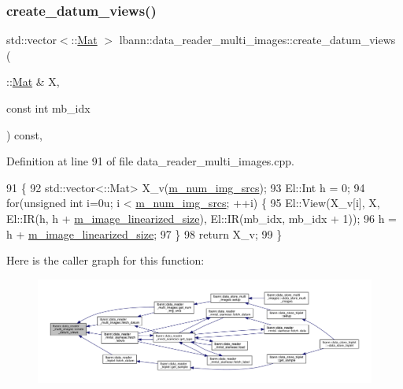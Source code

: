 \subsubsection{\texorpdfstring{create\+\_\+datum\+\_\+views()}{create\_datum\_views()}}
{\footnotesize\ttfamily std\+::vector$<$\+::\hyperlink{base_8hpp_a68f11fdc31b62516cb310831bbe54d73}{Mat} $>$ lbann\+::data\+\_\+reader\+\_\+multi\+\_\+images\+::create\+\_\+datum\+\_\+views (\begin{DoxyParamCaption}\item[{\+::\hyperlink{base_8hpp_a68f11fdc31b62516cb310831bbe54d73}{Mat} \&}]{X,  }\item[{const int}]{mb\+\_\+idx }\end{DoxyParamCaption}) const\hspace{0.3cm}{\ttfamily [protected]}, {\ttfamily [virtual]}}



Definition at line 91 of file data\+\_\+reader\+\_\+multi\+\_\+images.\+cpp.


\begin{DoxyCode}
91                                                                                           \{
92   std::vector<::Mat> X\_v(\hyperlink{classlbann_1_1data__reader__multi__images_a70752a5442e99333fec52def9eadc58f}{m\_num\_img\_srcs});
93   El::Int h = 0;
94   \textcolor{keywordflow}{for}(\textcolor{keywordtype}{unsigned} \textcolor{keywordtype}{int} i=0u; i < \hyperlink{classlbann_1_1data__reader__multi__images_a70752a5442e99333fec52def9eadc58f}{m\_num\_img\_srcs}; ++i) \{
95     El::View(X\_v[i], X, El::IR(h, h + \hyperlink{classlbann_1_1image__data__reader_af512f1f866c0f654309b7f28886dca9a}{m\_image\_linearized\_size}), El::IR(mb\_idx, 
      mb\_idx + 1));
96     h = h + \hyperlink{classlbann_1_1image__data__reader_af512f1f866c0f654309b7f28886dca9a}{m\_image\_linearized\_size};
97   \}
98   \textcolor{keywordflow}{return} X\_v;
99 \}
\end{DoxyCode}
Here is the caller graph for this function\+:\nopagebreak
\begin{figure}[H]
\begin{center}
\leavevmode
\includegraphics[width=350pt]{classlbann_1_1data__reader__multi__images_a713e4cc80a2d3a2b721d0912e3773baa_icgraph}
\end{center}
\end{figure}
\mbox{\label{classlbann_1_1data__reader__multi__images_a37ef2f4e641c074d0f3bd51f11682fc7}} 
